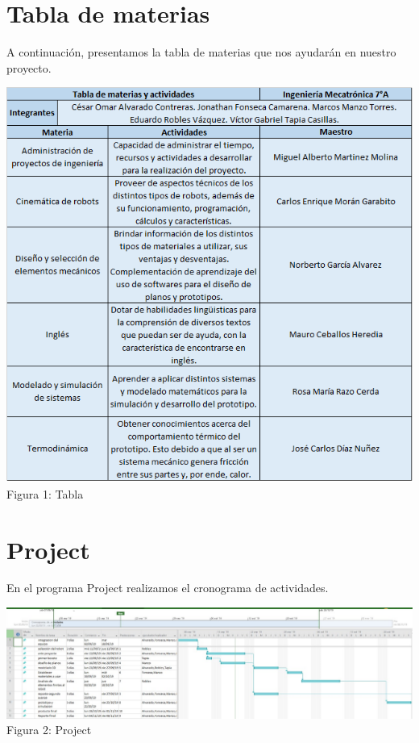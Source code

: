 \documentclass[11pt,a4paper,oldfontcommands,oneside]{memoir}
\begin{document}
\section{Tabla de materias}
A continuación, presentamos la tabla de materias que nos ayudarán en nuestro proyecto.\\
\begin{center}
\includegraphics[width=15cm]{tabla.png}
 \\
 Figura 1: Tabla 
\end{center}



\section{Project}
En el programa Project realizamos el cronograma de actividades.\\

\begin{center}
\includegraphics[width=18cm]{Project.png}
   Figura 2: Project
    
\end{center}
\end{document}

